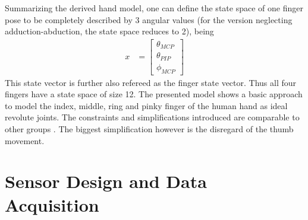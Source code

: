 Summarizing the derived hand model, one can define the state space of one finger pose to be completely described by 3 angular values (for the version neglecting adduction-abduction, the state space reduces to 2), being
\begin{equation*}
\begin{aligned}
x &= \begin{bmatrix}
				\theta_{MCP}\\
				\theta_{PIP}\\
				\phi_{MCP}
\end{bmatrix}
\end{aligned}
\end{equation*}
This state vector is further also refereed as the finger state vector. Thus all four fingers have a state space of size 12. The presented model shows a basic approach to model the index, middle, ring and pinky finger of the human hand as ideal revolute joints. The constraints and simplifications introduced are comparable to other groups \cite{lin2000modeling}. The biggest simplification however is the disregard of the thumb movement.

\FloatBarrier

\section{Sensor Design and Data Acquisition} \label{cha:sensors}

